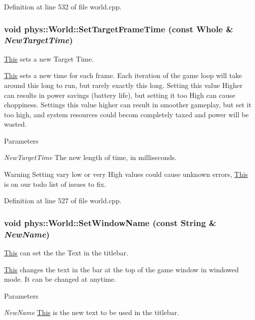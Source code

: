 Definition at line 532 of file world.cpp.

\hypertarget{classphys_1_1World_ad95b5a5ad73e0a05826b5bd834876333}{
\subsubsection[{SetTargetFrameTime}]{\setlength{\rightskip}{0pt plus 5cm}void phys::World::SetTargetFrameTime (const {\bf Whole} \& {\em NewTargetTime})}}
\label{da/ddf/classphys_1_1World_ad95b5a5ad73e0a05826b5bd834876333}


\hyperlink{structThis}{This} sets a new Target Time. 

\hyperlink{structThis}{This} sets a new time for each frame. Each iteration of the game loop will take around this long to run, but rarely exactly this long. Setting this value Higher can results in power savings (battery life), but setting it too High can cause choppiness. Settings this value higher can result in smoother gameplay, but set it too high, and system resources could becom completely taxed and power will be wasted. 
\begin{DoxyParams}{Parameters}
\item[{\em NewTargetTime}]The new length of time, in milliseconds. \end{DoxyParams}
\begin{DoxyWarning}{Warning}
Setting vary low or very High values could cause unknown errors, \hyperlink{structThis}{This} is on our todo list of issues to fix. 
\end{DoxyWarning}


Definition at line 527 of file world.cpp.

\hypertarget{classphys_1_1World_acd0dff342c08fe3008226488b7c53d97}{
\subsubsection[{SetWindowName}]{\setlength{\rightskip}{0pt plus 5cm}void phys::World::SetWindowName (const {\bf String} \& {\em NewName})}}
\label{da/ddf/classphys_1_1World_acd0dff342c08fe3008226488b7c53d97}


\hyperlink{structThis}{This} can set the the Text in the titlebar. 

\hyperlink{structThis}{This} changes the text in the bar at the top of the game window in windowed mode. It can be changed at anytime. 
\begin{DoxyParams}{Parameters}
\item[{\em NewName}]\hyperlink{structThis}{This} is the new text to be used in the titlebar. \end{DoxyParams}


